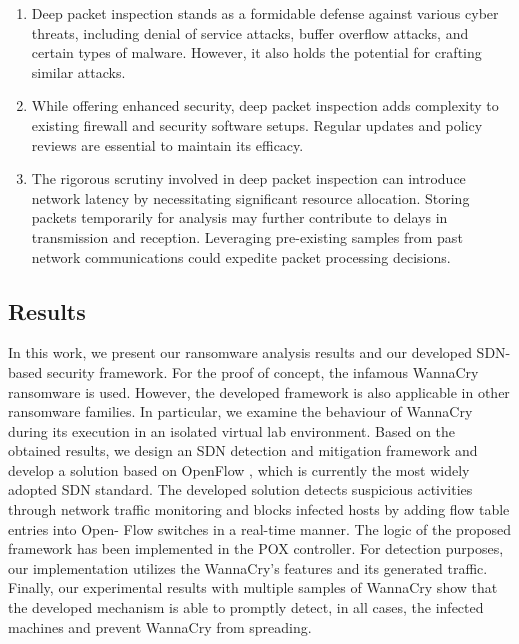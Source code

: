 \documentclass[12pt,letterpaper]{article}
\begin{document}
            \begin{enumerate}
                \item Deep packet inspection stands as a formidable defense against various cyber threats, including denial of service attacks, buffer overflow attacks, and certain types of malware. However, it also holds the potential for crafting similar attacks.

                \item While offering enhanced security, deep packet inspection adds complexity to existing firewall and security software setups. Regular updates and policy reviews are essential to maintain its efficacy.

                \item The rigorous scrutiny involved in deep packet inspection can introduce network latency by necessitating significant resource allocation. Storing packets temporarily for analysis may further contribute to delays in transmission and reception. Leveraging pre-existing samples from past network communications could expedite packet processing decisions.
                
            \end{enumerate}

    \subsection{Results}

    In this work, we present our ransomware analysis results and our developed SDN-based security framework. For the proof of concept, the infamous WannaCry ransomware is used. However, the developed framework is also applicable in other ransomware families. In particular, we examine the behaviour of WannaCry during its execution in an isolated virtual lab environment. Based on the obtained results, we design an SDN detection and mitigation framework and develop a solution based on OpenFlow \cite{10.1145/1355734.1355746, KazuyaSUZUKI2014}, which is currently the most widely adopted SDN standard. The developed solution detects suspicious activities through network traffic monitoring and blocks infected hosts by adding flow table entries into Open- Flow switches in a real-time manner. The logic of the proposed framework has been implemented in the POX controller. For detection purposes, our implementation utilizes the WannaCry’s features and its generated traffic. Finally, our experimental results with multiple samples of WannaCry show that the developed mechanism is able to promptly detect, in all cases, the infected machines and prevent WannaCry from spreading.
\end{document}
